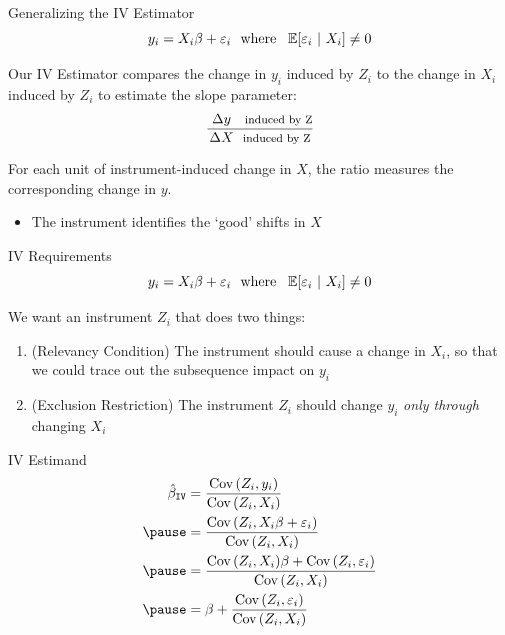 \documentclass[aspectratio=169,t,11pt,table]{beamer}
\begin{document}
\begin{frame}{Generalizing the IV Estimator}
  \vspace{-\bigskipamount}
  $$
    y_i = X_i \beta + \varepsilon_i \ \text{ where }\ \expec{\varepsilon_i}{X_i} \neq 0
  $$

  \bigskip
  Our IV Estimator compares the change in $y_i$ induced by $Z_i$ to the change in $X_i$ induced by $Z_i$ to estimate the slope parameter:
  $$
    \frac{\ \Delta y \text{\ \ \  \footnotesize induced by Z} }{ \Delta X \text{\ \ \footnotesize induced by Z} }
  $$

  \pause
  \bigskip
  For each unit of instrument-induced change in $X$, the ratio measures the corresponding change in $y$.
  \begin{itemize}
    \item The instrument identifies the `good' shifts in $X$
  \end{itemize}
\end{frame}

\begin{frame}{IV Requirements}
  \vspace{-\bigskipamount}
  $$
    y_i = X_i \beta + \varepsilon_i \ \text{ where }\ \expec{\varepsilon_i}{X_i} \neq 0
  $$
  
  \bigskip
  We want an instrument $Z_i$ that does two things:
  \begin{enumerate}
    \item {\color{blue} (Relevancy Condition)} The instrument should cause a change in $X_i$, so that we could trace out the subsequence impact on $y_i$ 

    \pause
    \medskip
    \item {\color{raspberry} (Exclusion Restriction)} The instrument $Z_i$ should change $y_i$ \emph{only through} changing $X_i$ 
  \end{enumerate}

\end{frame}

\begin{frame}{IV Estimand}
  \vspace{-\bigskipamount}
  \begin{align*}
    \hat{\beta}_{\texttt{IV}} &= 
    \frac{\cov{Z_i, y_i}}{\cov{Z_i, X_i}} \\
    \pause
    &= \frac{\cov{Z_i, X_i \beta + \varepsilon_i}}{\cov{Z_i, X_i}} \\
    \pause
    &= \frac{\cov{Z_i, X_i} \beta + \cov{Z_i, \varepsilon_i}}{\cov{Z_i, X_i}} \\
    \pause
    &= \beta + \frac{\cov{Z_i, \varepsilon_i}}{\cov{Z_i, X_i}}
  \end{align*}
\end{frame}
\end{document}
